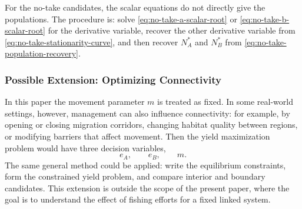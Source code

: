 \documentclass{article}
\numberwithin{equation}{section}
\begin{document}
For the no-take candidates, the scalar equations do not directly give
the populations. The procedure is: solve
\eqref{eq:no-take-a-scalar-root} or \eqref{eq:no-take-b-scalar-root}
for the derivative variable, recover the other derivative variable from
\eqref{eq:no-take-stationarity-curve}, and then recover
$N_A^*$ and $N_B^*$ from \eqref{eq:no-take-population-recovery}.

\begin{table}[H]
    \centering
    \scriptsize
    \setlength{\tabcolsep}{5pt}
    \renewcommand{\arraystretch}{1.6}
    \caption{Candidate yield maximizers for the linked fishing model.
    Each valid candidate must be compared with all other valid
    candidates.}
\end{table}

\subsubsection{Possible Extension: Optimizing Connectivity}
In this paper the movement parameter $m$ is treated as fixed. In some
real-world settings, however, management can also influence connectivity:
for example, by opening or closing migration corridors, changing habitat
quality between regions, or modifying barriers that affect movement.
Then the yield maximization problem would have three decision variables,
\begin{equation*}
    e_A,\qquad e_B,\qquad m.
\end{equation*}
The same general method could be applied: write the equilibrium
constraints, form the constrained yield problem, and compare interior and
boundary candidates. This extension is outside the scope of the present
paper, where the goal is to understand the effect of fishing efforts for
a fixed linked system.
\end{document}
